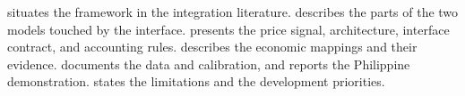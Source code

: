  situates the framework in the integration literature.
 describes the parts of the two models touched by the interface.
 presents the price signal, architecture, interface contract, and
accounting rules.  describes the economic mappings and their evidence.
 documents the data and calibration, and 
reports the Philippine demonstration.  states the limitations and
 the development priorities.
